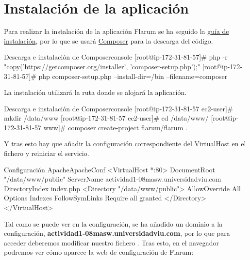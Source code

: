 \documentclass{\ClassPath/viu-tfm-template}
\begin{document}
\section{Instalación de la aplicación}

Para realizar la instalación de la aplicación Flarum se ha seguido la \href{https://docs.flarum.org/install#installing}{guía de instalación}, por lo que se usará \href{https://getcomposer.org/}{Composer} para la descarga del código.

\begin{mycode}{Descarga e instalación de Composer}{console}{{\scriptsize }}
[root@ip-172-31-81-57]# php -r "copy('https://getcomposer.org/installer', 'composer-setup.php');"
[root@ip-172-31-81-57]# php composer-setup.php --install-dir=/bin --filename=composer
\end{mycode}


La instalación utilizará la ruta  donde se alojará la aplicación.

\begin{mycode}{Descarga e instalación de Composer}{console}{{\small }}
[root@ip-172-31-81-57 ec2-user]# mkdir /data/www
[root@ip-172-31-81-57 ec2-user]# cd /data/www/
[root@ip-172-31-81-57 www]# composer create-project flarum/flarum .
\end{mycode}

Y tras esto hay que añadir la configuración correspondiente del VirtualHost en el fichero  y reiniciar el servicio.

\begin{mycode}{Configuración Apache}{ApacheConf}{}
<VirtualHost *:80>
  DocumentRoot "/data/www/public"
  ServerName actividad1-08masw.universidadviu.com
  DirectoryIndex index.php
  <Directory "/data/www/public">
    AllowOverride All
    Options Indexes FollowSymLinks
    Require all granted
  </Directory>
</VirtualHost>
\end{mycode}

Tal como se puede ver en la configuración, se ha añadido un dominio a la configuración, \textbf{actividad1-08masw.universidadviu.com}, por lo que para acceder deberemos modificar nuestro fichero . Tras esto, en el navegador podremos ver cómo aparece la web de configuración de Flarum:
\end{document}
